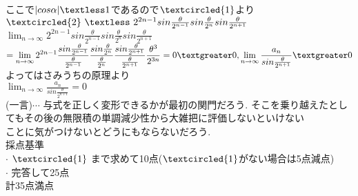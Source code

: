 \documentclass{article}
\begin{document}
ここで$|cos\alpha | \textless 1$であるので$\textcircled{1}$より\vspace{0.1in}\\
$\textcircled{2}\ \textless\ 2^{2n-1}sin\frac{\theta}{2^{n-1}}sin\frac{\theta}{2^{n}}sin\frac{\theta}{2^{n+1}}$\vspace{0.1in}\\
$\displaystyle \lim_{n \to \infty}2^{2n-1}sin\frac{\theta}{2^{n-1}}sin\frac{\theta}{2^{n}}sin\frac{\theta}{2^{n+1}}$\vspace{0.1in}\\
$=\displaystyle \lim_{n \to \infty}2^{2n-1}\frac{sin\frac{\theta}{2^{n-1}}}{\frac{\theta}{2^{n-1}}}\frac{sin\frac{\theta}{2^{n}}}{\frac{\theta}{2^{n}}}\frac{sin\frac{\theta}{2^{n+1}}}{\frac{\theta}{2^{n+1}}}\frac{\theta^3}{2^{3n}}=0\textgreater0, \displaystyle \lim_{n \to \infty}\frac{a_n}{sin\frac{\theta}{2^{n+1}}}\textgreater 0$\vspace{0.1in}\\
よってはさみうちの原理より\vspace{0.1in}\\
$\displaystyle \lim_{n \to \infty}\frac{a_n}{sin\frac{\theta}{2^{n+1}}}=0$\vspace{0.1in}\\
 (一言)$\cdots$ 与式を正しく変形できるかが最初の関門だろう. そこを乗り越えたとし\\
 \hspace{0.62in}てもその後の無限積の単調減少性から大雑把に評価しないといけない\\
 \hspace{0.62in}ことに気がつけないとどうにもならないだろう.\vspace{0.1in}\\
{\Large 採点基準}\vspace{0.1in}\\
 $\cdot$ $\textcircled{1}$ まで求めて10点($\textcircled{1}$がない場合は5点減点)\vspace{0.1in}\\
 $\cdot$ 完答して25点\vspace{0.1in}\\
計35点満点








 
\end{document}
